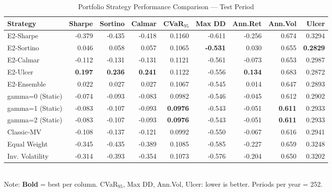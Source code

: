 \begin{table}[htbp]
\centering
\caption{Portfolio Strategy Performance Comparison — Test Period}
\label{tab:performance_comparison}
\begin{tabular}{lrrrrrrrr}
\toprule
Strategy & Sharpe & Sortino & Calmar & CVaR$_{95}$ & Max DD & Ann.Ret & Ann.Vol & Ulcer \\
\midrule
E2-Sharpe & -0.379 & -0.435 & -0.418 & 0.1160 & -0.611 & -0.256 & 0.674 & 0.3294 \\
E2-Sortino & 0.046 & 0.058 & 0.057 & 0.1065 & \textbf{-0.531} & 0.030 & 0.655 & \textbf{0.2829} \\
E2-Calmar & -0.112 & -0.131 & -0.131 & 0.1121 & -0.561 & -0.073 & 0.653 & 0.2987 \\
E2-Ulcer & \textbf{0.197} & \textbf{0.236} & \textbf{0.241} & 0.1122 & -0.556 & \textbf{0.134} & 0.683 & 0.2872 \\
E2-Ensemble & 0.022 & 0.027 & 0.027 & 0.1067 & -0.545 & 0.014 & 0.647 & 0.2893 \\
gamma=0 (Static) & -0.074 & -0.093 & -0.083 & 0.0982 & -0.546 & -0.045 & 0.612 & 0.2902 \\
gamma=1 (Static) & -0.083 & -0.107 & -0.093 & \textbf{0.0976} & -0.543 & -0.051 & \textbf{0.611} & 0.2933 \\
gamma=2 (Static) & -0.083 & -0.107 & -0.093 & \textbf{0.0976} & -0.543 & -0.051 & \textbf{0.611} & 0.2933 \\
Classic-MV & -0.108 & -0.137 & -0.121 & 0.0992 & -0.550 & -0.067 & 0.616 & 0.2941 \\
Equal Weight & -0.345 & -0.435 & -0.389 & 0.1085 & -0.585 & -0.227 & 0.659 & 0.3248 \\
Inv. Volatility & -0.314 & -0.393 & -0.354 & 0.1073 & -0.576 & -0.204 & 0.650 & 0.3202 \\
\bottomrule
\end{tabular}
\\[-4pt]
{\footnotesize Note: \textbf{Bold} = best per column. CVaR$_{95}$, Max DD, Ann.Vol, Ulcer: lower is better. Periods per year = 252.}
\end{table}